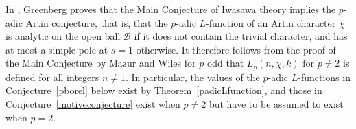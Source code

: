 \documentclass{amsart}
\begin{document}
\begin{remark}
  In \cite{greenberg83}, Greenberg proves that the Main Conjecture of
  Iwasawa theory implies the $p$-adic Artin conjecture, that is, that
  the {$p$-adic{\futurelet{}}} {$L$-function{\futurelet{}}} of an Artin character $\chi$ is analytic on
  the open ball $\mathcal{B}$ if it does not contain the trivial
  character, and has at most a simple pole at $ s=1 $ otherwise.
  It therefore follows from the proof of the Main Conjecture by
  Mazur and Wiles \cite{MW84} for $ p $ odd that ${L_{p}(n,{\chi},k)}$ for $ p\ne2 $ is
  defined for all integers $n\ne1$.  In particular, the values of the {$p$-adic{\futurelet{}}} {$L$-functions{\futurelet{}}}
  in Conjecture~\ref{pborel} below exist by Theorem~\ref{padicLfunction},
  and those in Conjecture~\ref{motiveconjecture} exist when $ p\ne2 $ but have to be assumed
  to exist when $p = 2$.
\end{remark}
\end{document}
